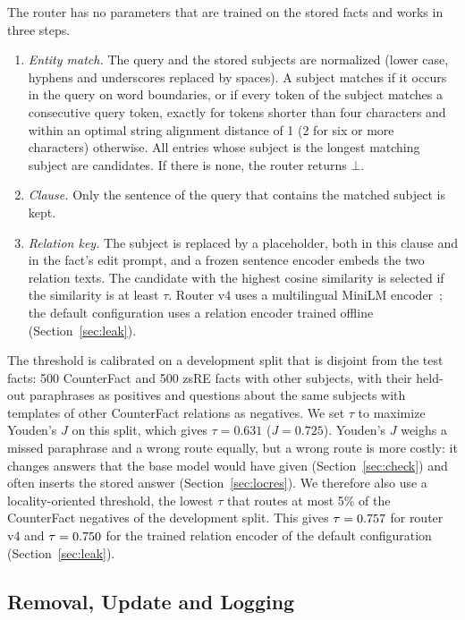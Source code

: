 \documentclass[journal,10pt]{IEEEtran}
\begin{document}
The router has no parameters that are trained on the stored facts and works in three
steps.
\begin{enumerate}
\item \emph{Entity match.} The query and the stored subjects are normalized (lower case,
hyphens and underscores replaced by spaces). A subject matches if it occurs in the query
on word boundaries, or if every token of the subject matches a consecutive query token,
exactly for tokens shorter than four characters and within an optimal string alignment
distance of 1 (2 for six or more characters) otherwise. All entries whose subject is the
longest matching subject are candidates. If there is none, the router returns $\bot$.
\item \emph{Clause.} Only the sentence of the query that contains the matched subject is
kept.
\item \emph{Relation key.} The subject is replaced by a placeholder, both in this clause
and in the fact's edit prompt, and a frozen sentence encoder embeds the two relation
texts. The candidate with the highest cosine similarity is selected if the similarity is
at least $\tau$. Router v4 uses a multilingual MiniLM
encoder~\cite{reimers2019sbert,reimers2020multilingual}; the default configuration uses
a relation encoder trained offline (Section~\ref{sec:leak}).
\end{enumerate}
The threshold is calibrated on a development split that is disjoint from the test facts:
500 CounterFact and 500 zsRE facts with other subjects, with their held-out paraphrases
as positives and questions about the same subjects with templates of other CounterFact
relations as negatives. We set $\tau$ to maximize Youden's $J$ on this split, which gives
$\tau=0.631$ ($J=0.725$). Youden's $J$ weighs a missed paraphrase and a wrong route
equally, but a wrong route is more costly: it changes answers that the base model would
have given (Section~\ref{sec:check}) and often inserts the stored answer
(Section~\ref{sec:locres}). We therefore also use a locality-oriented threshold, the
lowest $\tau$ that routes at most 5\% of the CounterFact negatives of the development
split. This gives $\tau=0.757$ for router v4 and $\tau=0.750$ for the trained
relation encoder of the default configuration (Section~\ref{sec:leak}).

\subsection{Removal, Update and Logging}
\end{document}
